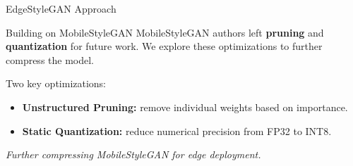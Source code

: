 \documentclass[aspectratio=169,xcolor=dvipsnames]{beamer}
\begin{document}
\begin{frame}{EdgeStyleGAN Approach}
    \begin{block}{Building on MobileStyleGAN}
        MobileStyleGAN authors left \textbf{pruning} and \textbf{quantization} for future work. We explore these optimizations to further compress the model.
    \end{block}
    
    \vspace{0.3cm}
    
    Two key optimizations:
    \begin{itemize}
        \item \textbf{Unstructured Pruning:} remove individual weights based on importance.
        \item \textbf{Static Quantization:} reduce numerical precision from FP32 to INT8.
    \end{itemize}
    \vspace{0.3cm}
    \textit{Further compressing MobileStyleGAN for edge deployment.}
\end{frame}
\end{document}
